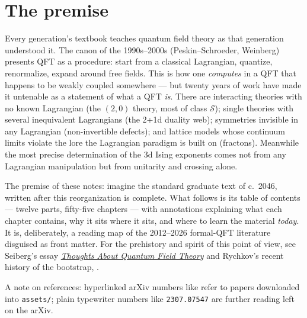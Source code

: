 
{}
\section*{The premise}

Every generation's textbook teaches quantum field theory as that generation understood it. The canon of the 1990s--2000s (Peskin--Schroeder, Weinberg) presents QFT as a procedure: start from a classical Lagrangian, quantize, renormalize, expand around free fields. This is how one \emph{computes} in a QFT that happens to be weakly coupled somewhere --- but twenty years of work have made it untenable as a statement of what a QFT \emph{is}. There are interacting theories with no known Lagrangian (the $(2,0)$ theory, most of class $\mathcal{S}$); single theories with several inequivalent Lagrangians (the 2+1d duality web); symmetries invisible in any Lagrangian (non-invertible defects); and lattice models whose continuum limits violate the lore the Lagrangian paradigm is built on (fractons). Meanwhile the most precise determination of the 3d Ising exponents comes not from any Lagrangian manipulation but from unitarity and crossing alone.

\noin The premise of these notes: imagine the standard graduate text of c.~2046, written after this reorganization is complete. What follows is its table of contents --- twelve parts, fifty-five chapters --- with annotations explaining what each chapter contains, why it sits where it sits, and where to learn the material \emph{today}. It is, deliberately, a reading map of the 2012--2026 formal-QFT literature disguised as front matter. For the prehistory and spirit of this point of view, see Seiberg's essay \href{https://www.ias.edu/sites/default/files/sns/files/QFT.pdf}{\emph{Thoughts About Quantum Field Theory}} and Rychkov's recent history of the bootstrap, .

\noin A note on references: hyperlinked arXiv numbers like  refer to papers downloaded into \texttt{assets/}; plain typewriter numbers like \texttt{2307.07547} are further reading left on the arXiv.


